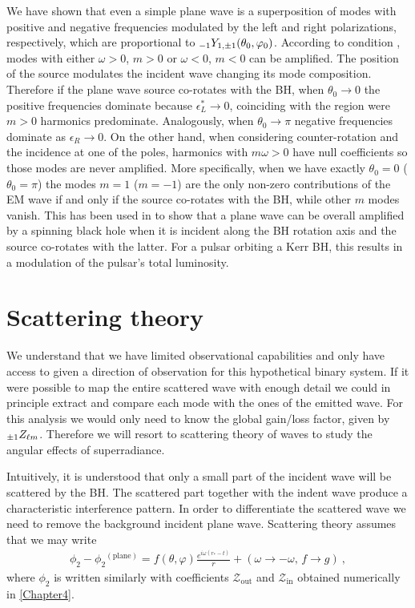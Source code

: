 We have shown that even a simple plane wave is a superposition of modes with positive and negative frequencies modulated by the left and right polarizations, respectively, which are proportional to $\uu[-1]{Y}{1, \pm 1}(\theta_0, \varphi_0)$.
According to condition , modes with either $\omega>0$, $m>0$ or $\omega<0$, $m<0$ can be amplified.
The position of the source modulates the incident wave changing its mode composition. 
Therefore if the plane wave source co-rotates with the BH, when $\theta_0 \to 0$ the positive frequencies dominate because $\epsilon_L^*\to 0$, coinciding with the region were $m>0$ harmonics predominate. Analogously, when $\theta_0\to\pi$ negative frequencies dominate as $\epsilon_R \to 0$.
On the other hand, when considering counter-rotation and the incidence at one of the poles, harmonics with $m \omega >0$ have null coefficients so those modes are never amplified.
More specifically, when we have exactly $\theta_0=0$ ($\theta_0=\pi$) the modes $m=1$ ($m=-1$) are the only non-zero contributions of the EM wave if and only if the source co-rotates with the BH, while other $m$ modes vanish.
This has been used in \cite{Rosa2016} to show that a plane wave can be overall amplified by a spinning black hole when it is incident along the BH rotation axis and the source co-rotates with the latter. For a pulsar orbiting a Kerr BH, this results in a modulation of the pulsar’s total luminosity.


\section{Scattering theory}

We understand that we have limited observational capabilities and only have access to given a direction of observation for this hypothetical binary system.
If it were possible to map the entire scattered wave with enough detail we could in principle extract and compare each mode with the ones of the emitted wave. For this analysis we would only need to know the global gain/loss factor, given by $\uu[\pm1]Z{\ell m}$. Therefore we will resort to scattering theory of waves to study the angular effects of superradiance.

Intuitively, it is understood that only a small part of the incident wave will be scattered by the BH.
The scattered part together with the indent wave produce a characteristic interference pattern.
In order to differentiate the scattered wave we need to remove the background incident plane wave.
Scattering theory assumes that we may write
\begin{align}
    \label{eq5:scattering}
    \phi_2 - \phi_2{}^{(\mathrm{plane})} = f(\theta,\varphi) \frac{e^{i \omega (r_{*}-t)}}{r} + (\omega\to-\omega, \,f \to g) ~,
\end{align}
where $\phi_2$ is written similarly with coefficients $\mathscr{Z}_\mathrm{out}$ and $\mathscr{Z}_\mathrm{in}$ obtained numerically in \cref{Chapter4}.

